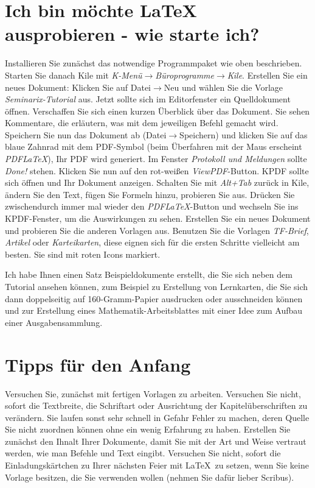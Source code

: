 \documentclass[a4paper,10pt]{scrartcl}
\begin{document}
\section*{Ich bin möchte \LaTeX \, ausprobieren - wie starte ich?}
Installieren Sie zunächst das notwendige Programmpaket wie oben beschrieben. Starten Sie danach Kile mit \emph{K-Menü$\rightarrow$Büroprogramme$\rightarrow$Kile}. Erstellen Sie ein neues Dokument: Klicken Sie auf Datei$\rightarrow$Neu und wählen Sie die Vorlage \emph{Seminarix-Tutorial} aus. Jetzt sollte sich im Editorfenster ein Quelldokument öffnen. Verschaffen Sie sich einen kurzen Überblick über das Dokument. Sie sehen Kommentare, die erläutern, was mit dem jeweiligen Befehl gemacht wird. Speichern Sie nun das Dokument ab (Datei$\rightarrow$Speichern) und klicken Sie auf das blaue Zahnrad mit dem PDF-Symbol (beim Überfahren mit der Maus erscheint \emph{PDFLaTeX}), Ihr PDF wird generiert. Im Fenster \emph{Protokoll und Meldungen} sollte \emph{Done!} stehen. Klicken Sie nun auf den rot-weißen \emph{ViewPDF}-Button. KPDF sollte sich öffnen und Ihr Dokument anzeigen. Schalten Sie mit \emph{Alt+Tab} zurück in Kile, ändern Sie den Text, fügen Sie Formeln hinzu, probieren Sie aus. Drücken Sie zwischendurch immer mal wieder den \emph{PDFLaTeX}-Button und wechseln Sie ins KPDF-Fenster, um die Auswirkungen zu sehen. Erstellen Sie ein neues Dokument und probieren Sie die anderen Vorlagen aus. Benutzen Sie die Vorlagen \textit{TF-Brief}, \textit{Artikel} oder \textit{Karteikarten}, diese eignen sich für die ersten Schritte vielleicht am besten. Sie sind mit roten Icons markiert.

Ich habe Ihnen einen Satz Beispieldokumente erstellt, die Sie sich neben dem Tutorial ansehen können, zum Beispiel zu Erstellung von Lernkarten, die Sie sich dann doppelseitig auf 160-Gramm-Papier ausdrucken oder ausschneiden können und zur Erstellung eines Mathematik-Arbeitsblattes mit einer Idee zum Aufbau einer Ausgabensammlung.

\section*{Tipps für den Anfang}
Versuchen Sie, zunächst mit fertigen Vorlagen zu arbeiten. Versuchen Sie nicht, sofort die Textbreite, die Schriftart oder Ausrichtung der Kapitelüberschriften zu verändern. Sie laufen sonst sehr schnell in Gefahr Fehler zu machen, deren Quelle Sie nicht zuordnen können ohne ein wenig Erfahrung zu haben. Erstellen Sie zunächst den Ihnalt Ihrer Dokumente, damit Sie mit der Art und Weise vertraut werden, wie man Befehle und Text eingibt. Versuchen Sie nicht, sofort die Einladungskärtchen zu Ihrer nächsten Feier mit \LaTeX \, zu setzen, wenn Sie keine Vorlage besitzen, die Sie verwenden wollen (nehmen Sie dafür lieber Scribus).
\end{document}
